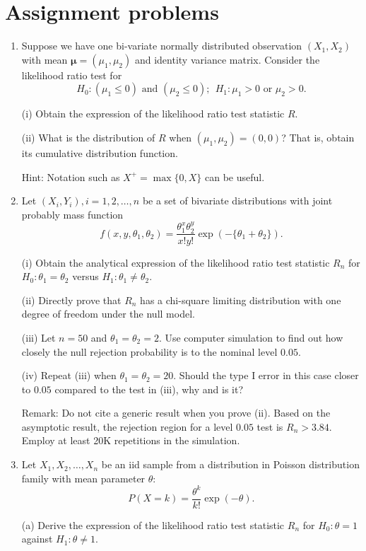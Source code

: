 \section{Assignment problems}
\begin{enumerate}
\item
Suppose we have one bi-variate normally distributed observation
$(X_1, X_2)$ with mean ${\mathbf \mu}= (\mu_1, \mu_2)$ and identity variance matrix.
Consider the likelihood ratio test for
\[
H_0:  (\mu_1 \leq 0) \mbox{ and } (\mu_2 \leq 0); ~~ H_1: \mu_1 > 0 \mbox{ or }  \mu_2 > 0.
\]

(i) Obtain the expression of the likelihood ratio test statistic $R$.

(ii) What is the distribution of $R$ when $(\mu_1, \mu_2) = (0, 0)$? That is, obtain
its cumulative distribution function.

Hint: Notation such as $X^+ = \max\{0, X\}$ can be useful.


\item
Let $(X_i, Y_i), i=1, 2, \ldots, n$ be a set of \iid bivariate distributions
with joint probably mass function
\[
f(x, y, \theta_1, \theta_2) = \frac{\theta_1^x \theta_2^y}{x!y!} \exp( - \{\theta_1 + \theta_2\}).
\]

(i) Obtain the analytical expression of the likelihood ratio test statistic $R_n$
for $H_0: \theta_1 = \theta_2$ versus $H_1: \theta_1 \neq \theta_2$.

(ii) Directly prove that $R_n$ has a chi-square limiting distribution 
with one degree of freedom under the null model.

(iii) Let $n=50$ and $\theta_1 = \theta_2 = 2$. Use computer simulation
to find out how closely the null rejection probability is to the nominal level $0.05$.

(iv) Repeat (iii) when $\theta_1 = \theta_2 = 20$. Should the type I error
in this case closer to $0.05$ compared to the test in (iii), why and is it?

Remark: Do not cite a generic result when you prove (ii).
Based on the asymptotic result, the rejection region for a level $0.05$ test
is $R_n > 3.84$.  Employ at least 20K repetitions in the simulation.

\item
Let $X_1, X_2, \ldots, X_n$ be an iid sample from a distribution in
Poisson distribution family with mean parameter $\theta$:
\[
P(X = k) = \frac{\theta^k}{k!} \exp(- \theta).
\]

(a) Derive the expression of the likelihood ratio test statistic $R_n$ for 
$H_0: \theta = 1$ against $H_1: \theta \neq 1$.


\end{enumerate}
